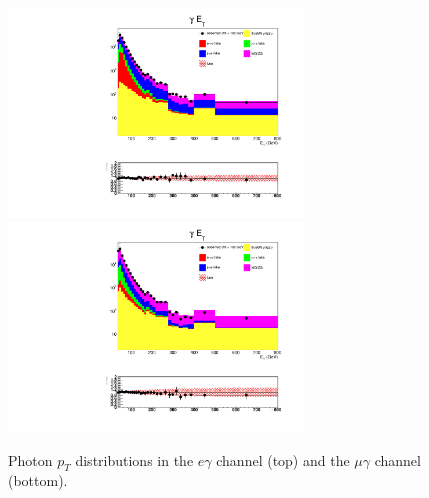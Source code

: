 \documentclass[thesis.tex]{subfiles}
\renewcommand\_{\textunderscore\allowbreak}
\begin{document}
\begin{figure}[hbtp]
  \centering
    \includegraphics[width=0.7\textwidth]{Figures/VALID_egamma_2016ReMiniAOD_pt.pdf} \\
    \includegraphics[width=0.7\textwidth]{Figures/VALID_mg_2016ReMiniAOD_pt.pdf} 
  \caption{Photon $p_T$ distributions in the $e\gamma$ channel (top) and the $\mu\gamma$ channel (bottom).}
    \label{fig:etvalidation}
\end{figure}
\end{document}
